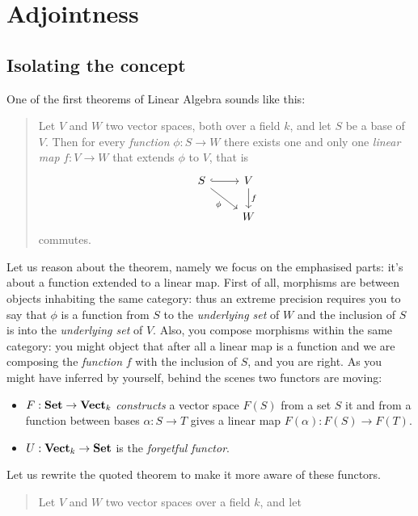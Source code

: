 
\chapter{Adjointness}

\section{Isolating the concept}

\begin{example}\label{example:DefineLinearFunctionsI}
  One of the first theorems of {\sc Linear Algebra} sounds like this:
  \begin{quote}
    Let \(V\) and \(W\) two vector spaces, both over a field \(k\), and
    let \(S\) be a base of \(V\). Then for every {\em function}
    \(\phi : S \to W\) there exists one and only one {\em linear map}
    \(f : V \to W\) that extends \(\phi\) to \(V\), that is
    \[
      \begin{tikzcd}
        S \ar[r, hook] \ar["\phi", dr, swap] & V \ar["f", d] \\
        & W
      \end{tikzcd}
    \]
    commutes.
  \end{quote}
  Let us reason about the theorem, namely we focus on the emphasised
  parts: it's about a function extended to a linear map. First of all,
  morphisms are between objects inhabiting the same category: thus an
  extreme precision requires you to say that \(\phi\) is a function from
  \(S\) to the {\em underlying set} of \(W\) and the inclusion of \(S\)
  is into the {\em underlying set} of \(V\). Also, you compose morphisms
  within the same category: you might object that after all a linear map
  is a function and we are composing the {\em function} \(f\)
  with the inclusion of \(S\), and you are right. As you might have
  inferred by yourself, behind the scenes two functors are moving:
  \begin{itemize}
  \item \(F : \mathbf{Set} \to \mathbf{Vect}_k\) {\em constructs} a vector space
    \(F(S)\) from a set \(S\) it and from a function between bases
    \(\alpha : S \to T\) gives a linear map \(F(\alpha) : F(S) \to F(T)\).
  \item \(U : \mathbf{Vect}_k \to \mathbf{Set}\) is the {\em forgetful functor}.
  \end{itemize}
  Let us rewrite the quoted theorem to make it more aware of these
  functors.
  \begin{quote}
    Let \(V\) and \(W\) two vector spaces over a field \(k\), and let

\end{quote}
\end{example}
